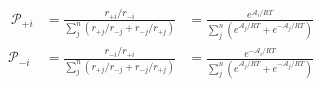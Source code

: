 \begin{eqnarray}\
{\mathcal P}_{+i}  & =  \frac{r_{+i}/r_{-i}}{\sum_j^n\left(r_{+j}/r_{-j} + r_{-j}/r_{+j}  \right)} & =  \frac{e^{\mathcal A_i/RT}}{\sum_j^n \left( e^{\mathcal A_j/RT} + e^{-\mathcal A_j/RT}\right)} \\
{\mathcal P}_{-i}  & =  \frac{r_{-i}/r_{+i}}{\sum_j^n\left(r_{+j}/r_{-j} + r_{-j}/r_{+j}  \right)} & =  \frac{e^{-\mathcal A_i/RT}}{\sum_j^n \left(e^{\mathcal A_j/RT} + e^{-\mathcal A_j/RT}\right)} \\\end{eqnarray}